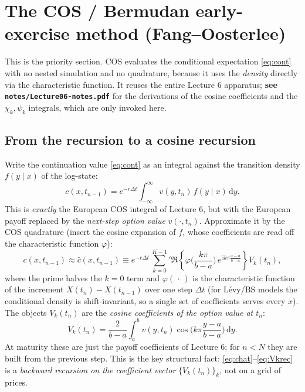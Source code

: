 \documentclass[11pt]{article}
\newcommand{\ii}{\mathrm{i}}
\newcommand{\dd}{\,\mathrm{d}}
\newcommand{\ch}{\varphi}
\begin{document}
\section{The COS / Bermudan early-exercise method (Fang--Oosterlee)}\label{sec:cos}

This is the priority section. COS evaluates the conditional expectation \eqref{eq:cont} with no nested
simulation and no quadrature, because it uses the \emph{density} directly via the characteristic function. It
reuses the entire Lecture 6 apparatus; \textbf{see \texttt{notes/Lecture06-notes.pdf}} for the derivations of
the cosine coefficients and the $\chi_k,\psi_k$ integrals, which are only invoked here.

\subsection{From the recursion to a cosine recursion}
Write the continuation value \eqref{eq:cont} as an integral against the transition density $f(y\mid x)$ of the
log-state:
\begin{equation}\label{eq:cosc}
c(x,t_{n-1})=e^{-r\Delta t}\int_{-\infty}^{\infty} v(y,t_n)\,f(y\mid x)\dd y .
\end{equation}
This is \emph{exactly} the European COS integral of Lecture 6, but with the European payoff replaced by the
\emph{next-step option value} $v(\cdot,t_n)$. Approximate it by the COS quadrature (insert the cosine expansion
of $f$, whose coefficients are read off the characteristic function $\ch$):
\begin{equation}\label{eq:chat}
c(x,t_{n-1})\approx\hat c(x,t_{n-1})\equiv e^{-r\Delta t}\,{\sum_{k=0}^{K-1}}'
\Re\!\left\{\ch\!\Big(\frac{k\pi}{b-a}\Big)\,e^{\,\ii k\pi\frac{x-a}{b-a}}\right\}V_k(t_n),
\end{equation}
where the prime halves the $k=0$ term and $\ch(\,\cdot\,)$ is the characteristic function of the increment
$X(t_n)-X(t_{n-1})$ over one step $\Delta t$ (for L\'evy/BS models the conditional density is
shift-invariant, so a single set of coefficients serves every $x$). The objects $V_k(t_n)$ are the
\emph{cosine coefficients of the option value at $t_n$}:
\begin{equation}\label{eq:Vkrec}
V_k(t_n)=\frac{2}{b-a}\int_a^b v(y,t_n)\cos\!\Big(k\pi\frac{y-a}{b-a}\Big)\dd y .
\end{equation}
At maturity these are just the payoff coefficients of Lecture 6; for $n<N$ they are built from the previous
step. This is the key structural fact: \eqref{eq:chat}--\eqref{eq:Vkrec} is a \emph{backward recursion on the
coefficient vector} $\{V_k(t_n)\}_k$, not on a grid of prices.
\end{document}
